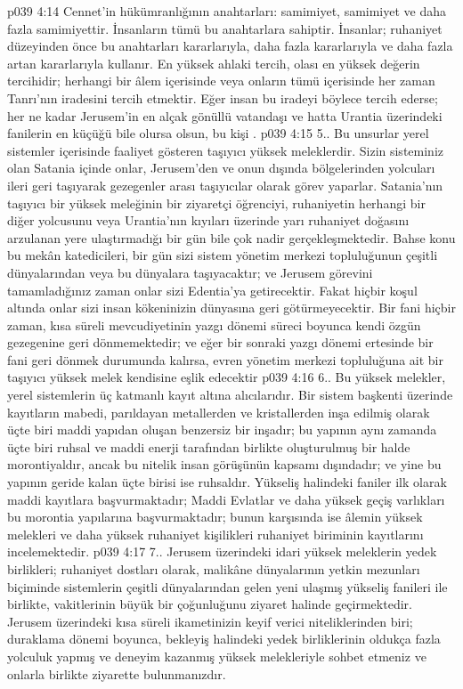 \vs p039 4:14 Cennet’in hükümranlığının anahtarları: samimiyet, samimiyet ve daha fazla samimiyettir. İnsanların tümü bu anahtarlara sahiptir. İnsanlar; ruhaniyet düzeyinden önce bu anahtarları kararlarıyla, daha fazla kararlarıyla ve daha fazla artan kararlarıyla kullanır. En yüksek ahlaki tercih, olası en yüksek değerin tercihidir; herhangi bir âlem içerisinde veya onların tümü içerisinde her zaman Tanrı’nın iradesini tercih etmektir. Eğer insan bu iradeyi böylece tercih ederse; her ne kadar Jerusem’in en alçak gönüllü vatandaşı ve hatta Urantia üzerindeki fanilerin en küçüğü bile olursa olsun, bu kişi .
\vs p039 4:15 5.\bibnobreakspace {}. Bu unsurlar yerel sistemler içerisinde faaliyet gösteren taşıyıcı yüksek meleklerdir. Sizin sisteminiz olan Satania içinde onlar, Jerusem’den ve onun dışında bölgelerinden yolcuları ileri geri taşıyarak gezegenler arası taşıyıcılar olarak görev yaparlar. Satania’nın taşıyıcı bir yüksek meleğinin bir ziyaretçi öğrenciyi, ruhaniyetin herhangi bir diğer yolcusunu veya Urantia’nın kıyıları üzerinde yarı ruhaniyet doğasını arzulanan yere ulaştırmadığı bir gün bile çok nadir gerçekleşmektedir. Bahse konu bu mekân katedicileri, bir gün sizi sistem yönetim merkezi topluluğunun çeşitli dünyalarından veya bu dünyalara taşıyacaktır; ve Jerusem görevini tamamladığınız zaman onlar sizi Edentia’ya getirecektir. Fakat hiçbir koşul altında onlar sizi insan kökeninizin dünyasına geri götürmeyecektir. Bir fani hiçbir zaman, kısa süreli mevcudiyetinin yazgı dönemi süreci boyunca kendi özgün gezegenine geri dönmemektedir; ve eğer bir sonraki yazgı dönemi ertesinde bir fani geri dönmek durumunda kalırsa, evren yönetim merkezi topluluğuna ait bir taşıyıcı yüksek melek kendisine eşlik edecektir
\vs p039 4:16 6.\bibnobreakspace {}. Bu yüksek melekler, yerel sistemlerin üç katmanlı kayıt altına alıcılarıdır. Bir sistem başkenti üzerinde kayıtların mabedi, parıldayan metallerden ve kristallerden inşa edilmiş olarak üçte biri maddi yapıdan oluşan benzersiz bir inşadır; bu yapının aynı zamanda üçte biri ruhsal ve maddi enerji tarafından birlikte oluşturulmuş bir halde morontiyaldır, ancak bu nitelik insan görüşünün kapsamı dışındadır; ve yine bu yapının geride kalan üçte birisi ise ruhsaldır. Yükseliş halindeki faniler ilk olarak maddi kayıtlara başvurmaktadır; Maddi Evlatlar ve daha yüksek geçiş varlıkları bu morontia yapılarına başvurmaktadır; bunun karşısında ise âlemin yüksek melekleri ve daha yüksek ruhaniyet kişilikleri ruhaniyet biriminin kayıtlarını incelemektedir.
\vs p039 4:17 7.\bibnobreakspace {}. Jerusem üzerindeki idari yüksek meleklerin yedek birlikleri; ruhaniyet dostları olarak, malikâne dünyalarının yetkin mezunları biçiminde sistemlerin çeşitli dünyalarından gelen yeni ulaşmış yükseliş fanileri ile birlikte, vakitlerinin büyük bir çoğunluğunu ziyaret halinde geçirmektedir. Jerusem üzerindeki kısa süreli ikametinizin keyif verici niteliklerinden biri; duraklama dönemi boyunca, bekleyiş halindeki yedek birliklerinin oldukça fazla yolculuk yapmış ve deneyim kazanmış yüksek melekleriyle sohbet etmeniz ve onlarla birlikte ziyarette bulunmanızdır.
